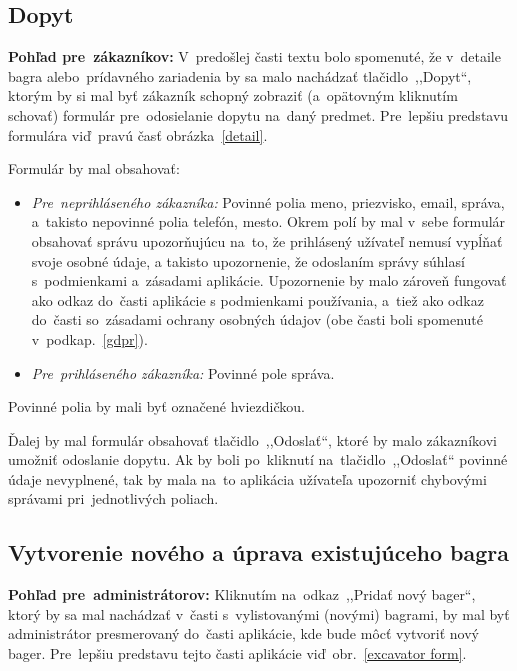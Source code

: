 \subsection{Dopyt}
\label{dopyt}

\textbf{Pohľad pre~zákazníkov:} V~predošlej časti textu bolo spomenuté, že v~detaile bagra alebo~prídavného zariadenia by sa malo nachádzať tlačidlo~,,Dopyt``, ktorým by si mal byť zákazník schopný zobraziť (a~opätovným kliknutím schovať) formulár pre~odosielanie dopytu na~daný predmet. Pre~lepšiu predstavu formulára viď~pravú časť obrázka~\ref{detail}.

Formulár by mal obsahovať:
\begin{itemize}
\item \textit{Pre~neprihláseného zákazníka:}
Povinné polia meno, priezvisko, email, sprá\-va, a~takisto nepovinné polia telefón, mesto. Okrem polí by mal v~sebe formulár obsahovať správu upozorňujúcu na~to, že prihlásený užívateľ nemusí vypĺňať svoje osobné údaje, a takisto upozornenie, že odoslaním správy súhlasí s~podmienkami a~zásadami aplikácie. Upozornenie by malo zároveň fungovať ako odkaz do~časti aplikácie s podmienkami používania, a~tiež ako odkaz do~časti so~zásadami ochrany osobných údajov (obe časti boli spomenuté v~podkap.~\ref{gdpr}).
\item \textit{Pre~prihláseného zákazníka:}
Povinné pole správa.
\end{itemize}
Povinné polia by mali byť označené hviezdičkou.

Ďalej by mal formulár obsahovať tlačidlo~,,Odoslať``, ktoré by malo zákazníkovi umožniť odoslanie dopytu. Ak by boli po~kliknutí na~tlačidlo~,,Odoslať`` povinné údaje nevyplnené, tak by mala na~to aplikácia užívateľa upozorniť chybovými správami pri~jednotlivých poliach.
\newpage
\subsection{Vytvorenie nového a úprava existujúceho bagra}
\label{vytvorenie noveho a uprava existujuceho bagra}

\textbf{Pohľad pre~administrátorov:} Kliknutím na~odkaz~,,Pridať nový bager``, ktorý by sa mal nachádzať v~časti s~vylistovanými (novými) bagrami, by mal byť administrátor presmerovaný do~časti aplikácie, kde bude môcť vytvoriť nový bager. Pre~lepšiu predstavu tejto časti aplikácie viď~obr.~\ref{excavator form}.

